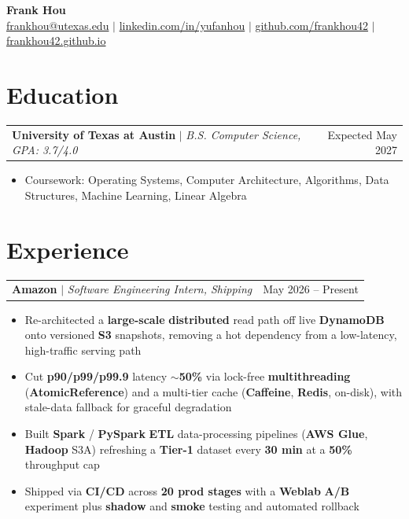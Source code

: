 \documentclass[letterpaper,10pt]{article}
\makeatletter
\newcommand{\resumeWorkHeading}[2]{%
  \vspace{2pt}\noindent
  \begin{tabular*}{\textwidth}{@{}l@{\extracolsep{\fill}}r@{}}
    #1 & #2 \\
  \end{tabular*}%
  \vspace{-2pt}
}
\newcommand{\resumeItemListStart}{\begin{itemize}}
\newcommand{\resumeItemListEnd}{\end{itemize}\vspace{3pt}}
\newcommand{\resumeItem}[1]{\item #1}
\makeatother
\begin{document}
\begin{center}
  {\huge \textbf{Frank Hou}} \\[2pt]
  \small
  \href{mailto:frankhou@utexas.edu}{frankhou@utexas.edu} $|$
  \href{https://linkedin.com/in/yufanhou}{linkedin.com/in/yufanhou} $|$
  \href{https://github.com/frankhou42}{github.com/frankhou42} $|$
  \href{https://frankhou42.github.io/}{frankhou42.github.io}
\end{center}
\vspace{-4pt}

\section{Education}
\resumeWorkHeading
{\textbf{University of Texas at Austin} $|$ \emph{B.S. Computer Science, GPA: 3.7/4.0}}{Expected May 2027}
\resumeItemListStart
\resumeItem{Coursework: Operating Systems, Computer Architecture, Algorithms, Data Structures, Machine Learning, Linear Algebra}
\resumeItemListEnd

\section{Experience}
\resumeWorkHeading
{\textbf{Amazon} $|$ \emph{Software Engineering Intern, Shipping}}{May 2026 -- Present}
\resumeItemListStart
\resumeItem{Re-architected a \textbf{large-scale} \textbf{distributed} read path off live \textbf{DynamoDB} onto versioned \textbf{S3} snapshots, removing a hot dependency from a low-latency, high-traffic serving path}
\resumeItem{Cut \textbf{p90/p99/p99.9} latency \textbf{$\sim$50\%} via lock-free \textbf{multithreading} (\textbf{AtomicReference}) and a multi-tier cache (\textbf{Caffeine}, \textbf{Redis}, on-disk), with stale-data fallback for graceful degradation}
\resumeItem{Built \textbf{Spark} / \textbf{PySpark} \textbf{ETL} data-processing pipelines (\textbf{AWS Glue}, \textbf{Hadoop} S3A) refreshing a \textbf{Tier-1} dataset every \textbf{30 min} at a \textbf{50\%} throughput cap}
\resumeItem{Shipped via \textbf{CI/CD} across \textbf{20 prod stages} with a \textbf{Weblab} \textbf{A/B} experiment plus \textbf{shadow} and \textbf{smoke} testing and automated rollback}
\resumeItemListEnd
\end{document}
